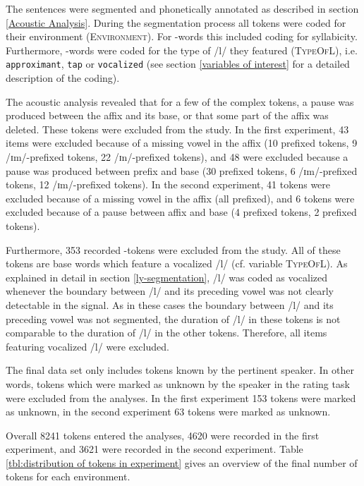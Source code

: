 The sentences were segmented and phonetically annotated as described in section \ref{Acoustic Analysis}. 
During the segmentation process all tokens were coded for their environment (\textsc{Environment}). For -words this included coding for syllabicity. Furthermore, -words were coded for the type of /l/ they featured (\textsc{TypeOfL}), i.e. \texttt{approximant}, \texttt{tap} or \texttt{vocalized} (see section \ref{variables of interest} for a detailed description of the coding).


 The acoustic analysis revealed that for a few of the complex tokens, a pause was produced between the affix and its base, or that some part of the affix was deleted. These tokens were excluded from the study. 
 In the first experiment, 43 items were excluded because of a missing vowel in the affix  (10  prefixed tokens,  9 /ɪm/-prefixed tokens, 22 /ɪn/-prefixed tokens), and 48 were excluded because a pause was produced between prefix and base (30  prefixed tokens,  6 /ɪm/-prefixed tokens, 12 /ɪm/-prefixed tokens). 
 In the second experiment, 41 tokens were excluded because of a missing vowel in the affix (all prefixed), and 6 tokens were excluded because of a pause between affix and base (4 prefixed tokens, 2 prefixed tokens). %


Furthermore, 353 recorded -tokens were excluded from the study. %
All of these tokens are base words which feature a vocalized /l/ (cf. variable \textsc{TypeOfL}). As explained in detail in section \ref{ly-segmentation}, /l/ was coded as vocalized whenever the boundary between /l/ and its preceding vowel was not clearly detectable in the signal. As in these cases the boundary between /l/ and its preceding vowel was not segmented, 
the duration of /l/ in these tokens is not comparable to the duration of /l/ in the other tokens. Therefore, all items featuring vocalized /l/ were excluded.



 The final data set only includes tokens known by the pertinent speaker. In other words, tokens which were marked as unknown by the speaker in the rating task were excluded from the analyses. In the first experiment 153 tokens were marked as unknown, in the second experiment 63 tokens were marked as unknown.
 
 Overall 8241 tokens entered the analyses, 4620 were recorded in the first experiment, and  3621 were recorded in the second experiment. Table \ref{tbl:distribution of tokens in experiment} gives an overview of the final number of tokens for each environment. 
  

